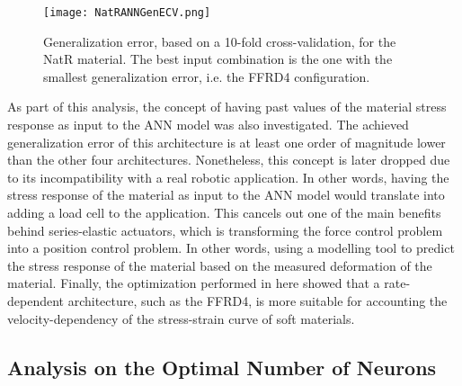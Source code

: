 \begin{figure}[htbp!]
	\centering
	\texttt{[image: NatRANNGenECV.png]}
	\caption{Generalization error, based on a 10-fold cross-validation, for the NatR material. The best input combination is the one with the smallest generalization error, i.e. the FFRD4 configuration.}
	\label{fig:ANNGenNatR}
\end{figure}

As part of this analysis, the concept of having past values of the material stress response as input to the ANN model was also investigated. The achieved generalization error of this architecture is at least one order of magnitude lower than the other four architectures. Nonetheless, this concept is later dropped due to its incompatibility with a real robotic application. In other words, having the stress response of the material as input to the ANN model would translate into adding a load cell to the application. This cancels out one of the main benefits behind series-elastic actuators, which is transforming the force control problem into a position control problem. In other words, using a modelling tool to predict the stress response of the material based on the measured deformation of the material. Finally, the optimization performed in here showed that a rate-dependent architecture, such as the FFRD4, is more suitable for accounting the velocity-dependency of the stress-strain curve of soft materials.

\subsection{Analysis on the Optimal Number of Neurons}

